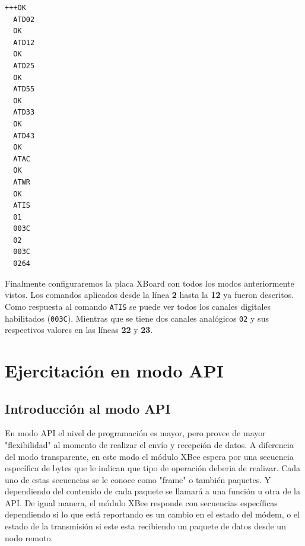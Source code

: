 \documentclass[11pt,oneside,spanish,a4paper]{article}
\begin{document}
\noindent\begin{minipage}{.35\textwidth}
\begin{lstlisting}[emph={+++,ATIS,ATD02,ATD12,ATD25,ATD55,ATD33,ATD43,ATWR,ATAC},
emphstyle={\color{blue}}, caption={GPIO de la placa XBoard.},label=code:completo]
  +++OK
  ATD02
  OK
  ATD12
  OK
  ATD25
  OK
  ATD55
  OK
  ATD33
  OK
  ATD43
  OK
  ATAC
  OK
  ATWR
  OK
  ATIS
  01
  003C
  02
  003C
  0264
\end{lstlisting}  
\end{minipage}\hfill
\begin{minipage}{.60\textwidth}
Finalmente configuraremos la placa XBoard con todos los modos
anteriormente vistos. Los comandos aplicados desde la línea \textbf{2}
hasta la \textbf{12} ya fueron descritos. Como respuesta al comando
\texttt{ATIS} se puede ver todos los canales digitales habilitados
(\texttt{003C}). Mientras que se tiene dos canales analógicos
\texttt{02} y sus respectivos valores en las líneas \textbf{22} y
\textbf{23}.
\end{minipage}
\section{Ejercitación en modo API}
\label{sec:API}
\subsection{Introducción al modo API}
En modo API el nivel de programación es mayor, pero provee de mayor "flexibilidad" al momento de realizar el envío y recepción de datos.
A diferencia del modo transparente, en este modo el módulo XBee espera por una secuencia específica de bytes que le indican que tipo de operación deberia de realizar. Cada uno de estas secuencias se le conoce como "frame" o también paquetes. Y dependiendo del contenido de cada paquete se llamará a una función u otra de la API.
De igual manera, el módulo XBee responde con secuencias específicas dependiendo si lo que está reportando es un cambio en el estado del módem, o el estado de la transmisión si este esta recibiendo un paquete de datos desde un nodo remoto.
\end{document}
